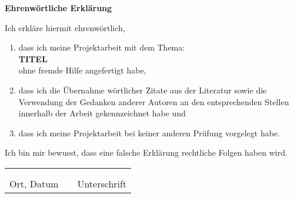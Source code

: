 \begin{center}
  \textbf{Ehrenwörtliche Erklärung}
\end{center}
\vspace*{1.5cm}
Ich erkläre hiermit ehrenwörtlich,
\begin{flushleft}
  \begin{enumerate}[leftmargin=0.5cm]
    \item 	dass ich meine {Projektarbeit}
    mit dem Thema:  \\
    \vspace*{1cm}
            \textbf{TITEL} \\
    \vspace*{1cm}
            ohne fremde Hilfe angefertigt habe, \\
    \item	dass ich die Übernahme wörtlicher Zitate aus der Literatur sowie die Verwendung der
            Gedanken anderer Autoren an den entsprechenden Stellen innerhalb der Arbeit gekennzeichnet habe und  \\
    \item	dass ich meine {Projektarbeit}
    bei keiner anderen Prüfung vorgelegt habe. \\
    \vspace*{1cm}
  \end{enumerate}
  \noindent
Ich bin mir bewusst, dass eine falsche Erklärung rechtliche Folgen haben wird.
\end{flushleft}
\vspace*{1cm}
\begin{tabular} {lrl}
  \hspace{5.5cm} & \hspace{3cm} & \hspace{5.5cm} \\
  \hrulefill & & \hrulefill \\
  Ort, Datum & & Unterschrift
\end{tabular}
\vspace*{\fill}
